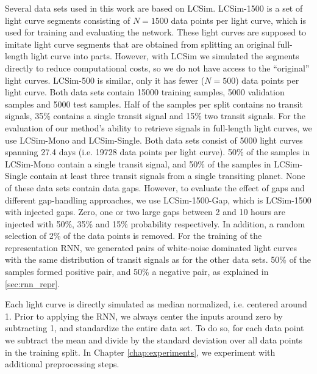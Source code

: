 Several data sets used in this work are based on LCSim. LCSim-1500 is a set of light curve segments consisting of $N=1500$ data points per light curve, which is used for training and evaluating the network. These light curves are supposed to imitate light curve segments that are obtained from splitting an original full-length light curve into parts. However, with LCSim we simulated the segments directly to reduce computational costs, so we do not have access to the ``original'' light curves. LCSim-500 is similar, only it has fewer ($N=500$) data points per light curve. Both data sets contain 15000 training samples, 5000 validation samples and 5000 test samples. Half of the samples per split contains no transit signals, 35\% contains a single transit signal and 15\% two transit signals. For the evaluation of our method's ability to retrieve signals in full-length light curves, we use LCSim-Mono and LCSim-Single. Both data sets consist of 5000 light curves spanning 27.4 days (i.e. 19728 data points per light curve). 50\% of the samples in LCSim-Mono contain a single transit signal, and 50\% of the samples in LCSim-Single contain at least three transit signals from a single transiting planet. None of these data sets contain data gaps. However, to evaluate the effect of gaps and different gap-handling approaches, we use LCSim-1500-Gap, which is LCSim-1500 with injected gaps. Zero, one or two large gaps between 2 and 10 hours are injected with 50\%, 35\% and 15\% probability respectively. In addition, a random selection of 2\% of the data points is removed. For the training of the representation RNN, we generated pairs of white-noise dominated light curves with the same distribution of transit signals as for the other data sets. 50\% of the samples formed positive pair, and 50\% a negative pair, as explained in \ref{sec:rnn_repr}.

Each light curve is directly simulated as median normalized, i.e. centered around 1. Prior to applying the RNN, we always center the inputs around zero by subtracting 1, and standardize the entire data set. To do so, for each data point we subtract the mean and divide by the standard deviation over all data points in the training split. In Chapter \ref{chap:experiments}, we experiment with additional preprocessing steps.



